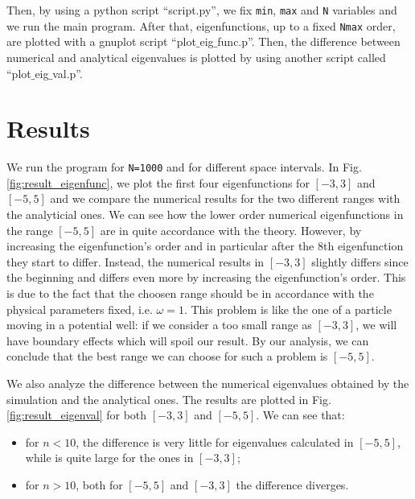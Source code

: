 \documentclass[rmp,10pt,onecolumn,fleqn,notitlepage]{revtex4-1}
\begin{document}
Then, by using a python script “script.py”, we fix \texttt{min}, \texttt{max} and \texttt{N} variables and we run the main program. After that, eigenfunctions, up to a fixed \texttt{Nmax} order, are plotted with a gnuplot script “plot$\_$eig$\_$func.p”. Then, the difference between numerical and analytical eigenvalues is plotted by using another script called “plot$\_$eig$\_$val.p”.



\section{Results}

We run the program for \texttt{N=1000} and for different space intervals. In Fig. \ref{fig:result_eigenfunc}, we plot the first four eigenfunctions for \( [-3,3] \) and \( [-5,5] \) and we compare the numerical results for the two different ranges with the analyticial ones. We can see how the lower order numerical eigenfunctions in the range \( [-5,5] \) are in quite accordance with the theory. However, by increasing the eigenfunction's order and in particular after the 8th eigenfunction they start to differ. Instead, the numerical results in  \( [-3,3] \) slightly differs since the beginning and differs even more by increasing the eigenfunction's order. This is due to the fact that the choosen range should be in accordance with the physical parameters fixed, i.e. \( \omega =1\). This problem is like the one of a particle moving in a potential well: if we consider a too small range as \( [-3,3] \), we will have boundary effects which will spoil our result.
By our analysis, we can conclude that the best range we can choose for such a problem is \( [-5,5] \).

We also analyze the difference between the numerical eigenvalues obtained by the simulation and the analytical ones. The results are plotted in Fig. \ref{fig:result_eigenval} for both \( [-3,3] \) and \( [-5,5] \). We can see that:
\begin{itemize}
\item for \( n<10 \), the difference is very little for eigenvalues calculated in \( [-5,5] \), while is quite large for the ones in \( [-3,3] \);
\item for \( n>10 \), both  for \( [-5,5] \) and \( [-3,3] \) the difference diverges.
\end{itemize}
\end{document}
